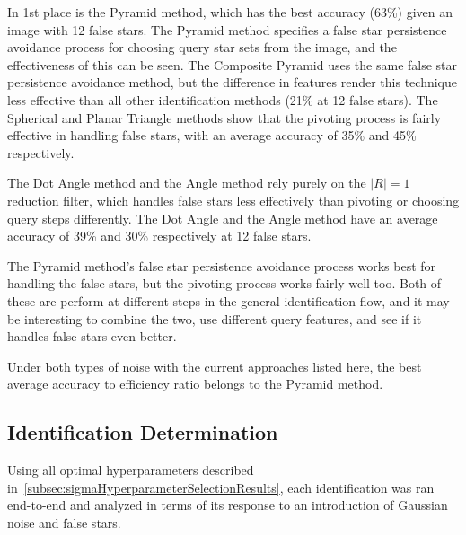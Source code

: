 In 1st place is the Pyramid method, which has the best accuracy (63\%) given an image with 12 false stars.
The Pyramid method specifies a false star persistence avoidance process for choosing query star sets from the image, and
the effectiveness of this can be seen.
The Composite Pyramid uses the same false star persistence avoidance method, but the difference in features render this
technique less effective than all other identification methods (21\% at 12 false stars).
The Spherical and Planar Triangle methods show that the pivoting process is fairly effective in handling false stars,
with an average accuracy of 35\% and 45\% respectively.

The Dot Angle method and the Angle method rely purely on the $|R| = 1$ reduction filter, which handles false stars less
effectively than pivoting or choosing query steps differently.
The Dot Angle and the Angle method have an average accuracy of 39\% and 30\% respectively at 12 false stars.

The Pyramid method's false star persistence avoidance process works best for handling the false stars, but the
pivoting process works fairly well too.
Both of these are perform at different steps in the general identification flow, and it may be interesting to combine
the two, use different query features, and see if it handles false stars even better.

Under both types of noise with the current approaches listed here, the best average accuracy to efficiency ratio
belongs to the Pyramid method.

\subsection{Identification Determination}\label{subsec:identificationDeterminationResults}
Using all optimal hyperparameters described in~\autoref{subsec:sigmaHyperparameterSelectionResults}, each identification
was ran end-to-end and analyzed in terms of its response to an introduction of Gaussian noise and false stars.

\begin{figure}
\end{figure}

